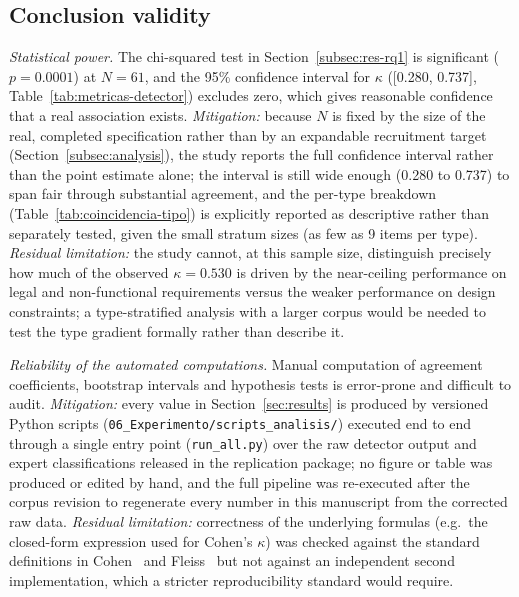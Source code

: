 \documentclass[pdflatex,sn-mathphys-num]{sn-jnl}
\theoremstyle{thmstyleone}%
\theoremstyle{thmstyletwo}%
\theoremstyle{thmstylethree}%
\begin{document}
	\subsection{Conclusion validity}\label{subsec:threats-conclusion}
	
	\emph{Statistical power.} The chi-squared test in
	Section~\ref{subsec:res-rq1} is significant ($p=0.0001$) at $N=61$, and the
	95\% confidence interval for $\kappa$ ([0.280, 0.737], Table~\ref{tab:metricas-detector})
	excludes zero, which gives reasonable confidence that a real association
	exists. \emph{Mitigation:} because $N$ is fixed by the size of the real,
	completed specification rather than by an expandable recruitment target
	(Section~\ref{subsec:analysis}), the study reports the full confidence
	interval rather than the point estimate alone; the interval is still wide
	enough (0.280 to 0.737) to span fair through substantial agreement, and the
	per-type breakdown (Table~\ref{tab:coincidencia-tipo}) is explicitly reported
	as descriptive rather than separately tested, given the small stratum sizes
	(as few as 9 items per type). \emph{Residual limitation:} the study cannot, at
	this sample size, distinguish precisely how much of the observed $\kappa=0.530$
	is driven by the near-ceiling performance on legal and non-functional
	requirements versus the weaker performance on design constraints; a
	type-stratified analysis with a larger corpus would be needed to test the
	type gradient formally rather than describe it.
	
	\emph{Reliability of the automated computations.} Manual computation of
	agreement coefficients, bootstrap intervals and hypothesis tests is error-prone
	and difficult to audit. \emph{Mitigation:} every value in
	Section~\ref{sec:results} is produced by versioned Python scripts
	(\texttt{06\_Experimento/scripts\_analisis/}) executed end to end through a
	single entry point (\texttt{run\_all.py}) over the raw detector output and
	expert classifications released in the replication package; no figure or table
	was produced or edited by hand, and the full pipeline was re-executed after the
	corpus revision to regenerate every number in this manuscript from the
	corrected raw data. \emph{Residual limitation:} correctness of the underlying
	formulas (e.g.\ the closed-form expression used for Cohen's $\kappa$) was
	checked against the standard definitions in Cohen~\cite{cohen1960} and
	Fleiss~\cite{fleiss1971} but not against an independent second implementation,
	which a stricter reproducibility standard would require.
	
\end{document}
